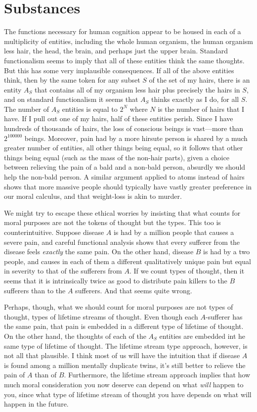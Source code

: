 \section{Substances}
The functions necessary for human cognition appear to be housed in each of a multiplicity of entities, including the 
whole human organism, the human organism less hair, the head, the brain, and perhaps just the upper brain. Standard functionalism
seems to imply that all of these entities think the same thoughts. But this has some very implausible consequences. If all 
of the above entities think, then by the same token for any subset $S$ of the set of my hairs, there is an entity $A_S$ that 
contains all of my organism less hair plus precisely the hairs in $S$, and on standard functionalism it seems that $A_S$ thinks
exactly as I do, for all $S$. The number of $A_S$ entities is equal to $2^N$ where $N$ is the number of hairs that I have. If I
pull out one of my hairs, half of these entities perish. Since I have hundreds of thousands of hairs, the loss of conscious
beings is vast---more than $2^{100000}$ beings. Moreover, pain had by a more hirsute person is shared by a much 
greater number of entities, all other things being equal, so it follows that other things being equal (such as the mass 
of the non-hair parts), given a choice between relieving the pain of a bald and a non-bald person, absurdly we should help 
the non-bald person. A similar argument applied to atoms instead of hairs shows that more massive people should typically have 
vastly greater preference in our moral calculus, and that weight-loss is akin to murder.

We might try to escape these ethical worries by insisting that what counts for moral purposes are not the tokens of thought
but the types. This too is counterintuitive. Suppose disease $A$ is had by a million 
people that causes a severe pain, and careful functional analysis shows that every sufferer from the disease feels 
\textit{exactly} the same pain. On the other hand, disease $B$ is had by a two people, and causes in each of them 
a different qualitatively unique pain but equal in severity to that of the sufferers from $A$. If we count types of 
thought, then it seems that it is intrinsically twice as good to distribute pain killers to the $B$ sufferers than to 
the $A$ sufferers. And that seems quite wrong.

Perhaps, though, what we should count for moral purposes are not types of thought, types of lifetime streams of thought.
Even though each $A$-sufferer has the same pain, that pain is embedded in a different type of lifetime of thought. On the other 
hand, the thoughts of each of the $A_S$ entities are embedded int he same type of lifetime of thought. The lifetime stream type
approach, however, is not all that plausible. I think most of us will have the intuition that if disease $A$ is found among
a million mentally duplicate twins, it's still better to relieve the pain of $A$ than of $B$. 
Furthermore, the lifetime stream approach implies that how much moral consideration you now deserve can depend on what 
\textit{will} happen to you, since what type of lifetime stream of thought you have depends on what will happen in the future.

